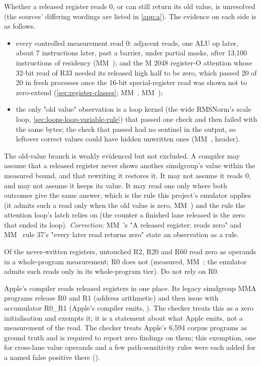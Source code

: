 Whether a released register reads 0, or can still return its old value, is unresolved (the sources' differing wordings
are listed in \cref{app:a}). The evidence on each side is as follows.

\begin{itemize}
\item every controlled measurement read 0: adjacent reads, one ALU op later, about 7 instructions later, past a barrier,
  under partial masks, after 13,100 instructions of residency (MM~); and the M 2048 register-O attention whose
  32-bit read of R33 needed its released high half to be zero, which passed 20 of 20 in fresh processes once
  the 16-bit special-register read was shown not to zero-extend (\cref{sec:register-classes}; MM~, MM~);
\item the only "old value" observation is a loop kernel (the wide RMSNorm's scale loop, \cref{sec:loops-loop-variable-rule}) that passed one check
  and then failed with the same bytes; the check that passed had no sentinel in the output, so leftover correct values
  could have hidden unwritten ones (MM~,  header).
\end{itemize}

The old-value branch is weakly evidenced but not excluded. A compiler may assume that a released register never
shows another simdgroup's value within the measured bound, and that rewriting it restores it. It may not assume it
reads 0, and may not assume it keeps its value. It may read one only where both outcomes give the same answer, which
is the rule this project's emulator applies (it admits such a read only when the old value is zero, MM~) and the
rule the attention loop's latch relies on (the counter a finished lane released is the zero that ended its loop).
\emph{Correction:} MM~'s "A released register: reads zero" and MM~ rule 37's "every later read returns zero" state an
observation as a rule.

Of the never-written registers, untouched R2, R20 and R60 read zero as operands in a whole-program measurement; R0 does not
(measured, MM~; the emulator admits such reads only in its whole-program tier). Do not rely on R0.

Apple's compiler reads released registers in one place. Its legacy simdgroup MMA programs release R0 and R1
(address arithmetic) and then issue  with accumulator R0\_R1 (Apple's compiler
emits, ). The checker treats this as a zero initialisation and exempts it; it is a statement
about what Apple emits, not a measurement of the read. The checker treats Apple's 6,594 corpus programs as ground
truth and is required to report zero findings on them; this exemption, one for cross-lane value operands and a few
path-sensitivity rules were each added for a named false positive there ().

